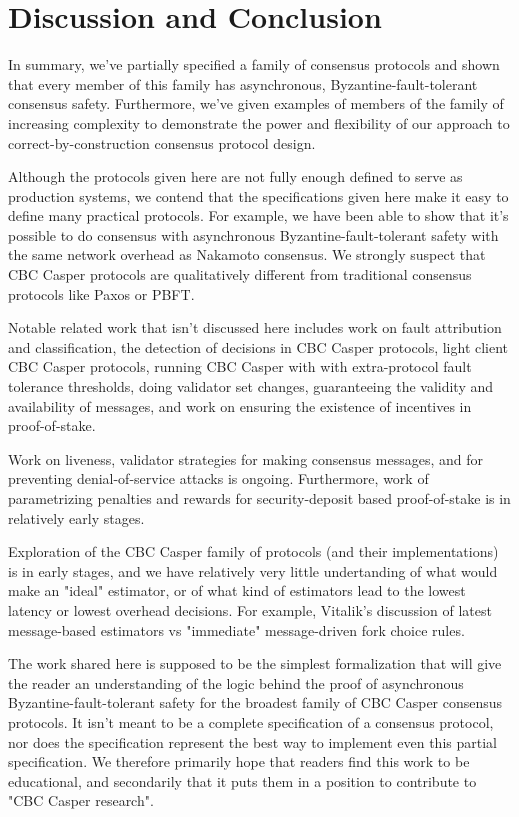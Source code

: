 \section{Discussion and Conclusion}

In summary, we've partially specified a family of consensus protocols and shown that every member of this family has asynchronous, Byzantine-fault-tolerant consensus safety. Furthermore, we've given examples of members of the family of increasing complexity to demonstrate the power and flexibility of our approach to correct-by-construction consensus protocol design.

Although the protocols given here are not fully enough defined to serve as production systems, we contend that the specifications given here make it easy to define many practical protocols. For example, we have been able to show that it's possible to do consensus with asynchronous Byzantine-fault-tolerant safety with the same network overhead as Nakamoto consensus. We strongly suspect that CBC Casper protocols are qualitatively different from traditional consensus protocols like Paxos\cite{paxos} or PBFT\cite{Castro_Liskov_1999_pbft}.

Notable related work that isn't discussed here includes work on fault attribution and classification, the detection of decisions in CBC Casper protocols, light client CBC Casper protocols, running CBC Casper with with extra-protocol fault tolerance thresholds, doing validator set changes, guaranteeing the validity and availability of messages, and work on ensuring the existence of incentives in proof-of-stake.

Work on liveness, validator strategies for making consensus messages, and for preventing denial-of-service attacks is ongoing. Furthermore, work of parametrizing penalties and rewards for security-deposit based proof-of-stake is in relatively early stages. 

Exploration of the CBC Casper family of protocols (and their implementations) is in early stages, and we have relatively very little undertanding of what would make an "ideal" estimator, or of what kind of estimators lead to the lowest latency or lowest overhead decisions. For example, Vitalik's discussion of latest message-based estimators vs "immediate" message-driven fork choice rules\cite{vitalik-FFG-CBC-wars-tweet-thread}.

The work shared here is supposed to be the simplest formalization that will give the reader an understanding of the logic behind the proof of asynchronous Byzantine-fault-tolerant safety for the broadest family of CBC Casper consensus protocols. It isn't meant to be a complete specification of a consensus protocol, nor does the specification represent the best way to implement even this partial specification. We therefore primarily hope that readers find this work to be educational, and secondarily that it puts them in a position to contribute to "CBC Casper research".
